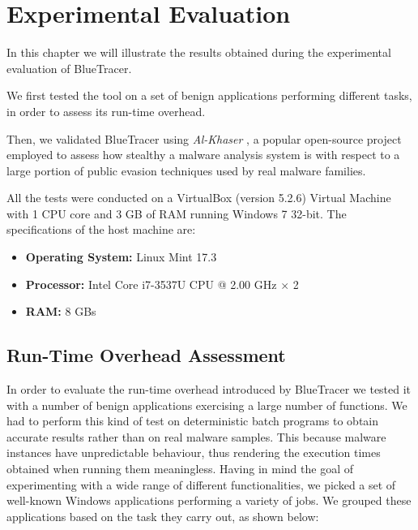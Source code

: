 
\chapter{Experimental Evaluation} \label{results}

In this chapter we will illustrate the results obtained during the experimental evaluation of BlueTracer.

We first tested the tool on a set of benign applications performing different tasks, in order to assess its run-time overhead.

Then, we validated BlueTracer using \textit{Al-Khaser} \cite{AlK}, a popular open-source project employed to assess how stealthy a malware analysis system is with respect to a large portion of public evasion techniques used by real malware families.

\iffalse
Finally, we employed BlueTracer to analyze a group of highly evasive real malware samples collected by Joe Security, the proclaimed technology leader for the analysis of evasive malware.
\fi

\iffalse
If JoeBox added differentiate machines
\fi
All the tests were conducted on a VirtualBox (version 5.2.6)  Virtual Machine with 1 CPU core and 3 GB of RAM running Windows 7 32-bit. The specifications of the host machine are:
\begin{itemize}
\item \textbf{Operating System:} Linux Mint 17.3 
\item \textbf{Processor:} Intel Core i7-3537U CPU @ 2.00 GHz $\times$ 2
\item \textbf{RAM:} 8 GBs  
\end{itemize}
 

\section{Run-Time Overhead Assessment}

In order to evaluate the run-time overhead introduced by BlueTracer we tested it with a number of benign applications exercising a large number of functions. We had to perform this kind of test on deterministic batch programs to obtain accurate results rather than on real malware samples. This because malware instances have unpredictable behaviour, thus rendering the execution times obtained when running them meaningless.
Having in mind the goal of experimenting with a wide range of different functionalities, we picked a set of well-known Windows applications performing a variety of jobs. We grouped these applications based on the task they carry out, as shown below:

